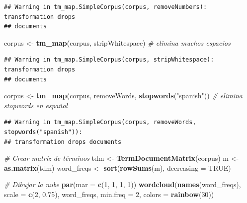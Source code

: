 \documentclass[
]{article}
\newenvironment{Shaded}{\begin{snugshade}}{\end{snugshade}}
\newcommand{\AttributeTok}[1]{\textcolor[rgb]{0.13,0.29,0.53}{#1}}
\newcommand{\CommentTok}[1]{\textcolor[rgb]{0.56,0.35,0.01}{\textit{#1}}}
\newcommand{\ConstantTok}[1]{\textcolor[rgb]{0.56,0.35,0.01}{#1}}
\newcommand{\DecValTok}[1]{\textcolor[rgb]{0.00,0.00,0.81}{#1}}
\newcommand{\FloatTok}[1]{\textcolor[rgb]{0.00,0.00,0.81}{#1}}
\newcommand{\FunctionTok}[1]{\textcolor[rgb]{0.13,0.29,0.53}{\textbf{#1}}}
\newcommand{\NormalTok}[1]{#1}
\newcommand{\OtherTok}[1]{\textcolor[rgb]{0.56,0.35,0.01}{#1}}
\newcommand{\StringTok}[1]{\textcolor[rgb]{0.31,0.60,0.02}{#1}}
\begin{document}
\begin{verbatim}
## Warning in tm_map.SimpleCorpus(corpus, removeNumbers): transformation drops
## documents
\end{verbatim}

\begin{Shaded}
\begin{Highlighting}[]
\NormalTok{corpus }\OtherTok{\textless{}{-}} \FunctionTok{tm\_map}\NormalTok{(corpus, stripWhitespace)                      }\CommentTok{\# elimina muchos espacios}
\end{Highlighting}
\end{Shaded}

\begin{verbatim}
## Warning in tm_map.SimpleCorpus(corpus, stripWhitespace): transformation drops
## documents
\end{verbatim}

\begin{Shaded}
\begin{Highlighting}[]
\NormalTok{corpus }\OtherTok{\textless{}{-}} \FunctionTok{tm\_map}\NormalTok{(corpus, removeWords, }\FunctionTok{stopwords}\NormalTok{(}\StringTok{"spanish"}\NormalTok{))    }\CommentTok{\# elimina stopwords en español}
\end{Highlighting}
\end{Shaded}

\begin{verbatim}
## Warning in tm_map.SimpleCorpus(corpus, removeWords, stopwords("spanish")):
## transformation drops documents
\end{verbatim}

\begin{Shaded}
\begin{Highlighting}[]
\CommentTok{\# Crear matriz de términos}
\NormalTok{tdm }\OtherTok{\textless{}{-}} \FunctionTok{TermDocumentMatrix}\NormalTok{(corpus)}
\NormalTok{m }\OtherTok{\textless{}{-}} \FunctionTok{as.matrix}\NormalTok{(tdm)}
\NormalTok{word\_freqs }\OtherTok{\textless{}{-}} \FunctionTok{sort}\NormalTok{(}\FunctionTok{rowSums}\NormalTok{(m), }\AttributeTok{decreasing =} \ConstantTok{TRUE}\NormalTok{)}

\CommentTok{\# Dibujar la nube}
\FunctionTok{par}\NormalTok{(}\AttributeTok{mar =} \FunctionTok{c}\NormalTok{(}\DecValTok{1}\NormalTok{, }\DecValTok{1}\NormalTok{, }\DecValTok{1}\NormalTok{, }\DecValTok{1}\NormalTok{))}
\FunctionTok{wordcloud}\NormalTok{(}\FunctionTok{names}\NormalTok{(word\_freqs), }\AttributeTok{scale =} \FunctionTok{c}\NormalTok{(}\DecValTok{2}\NormalTok{, }\FloatTok{0.75}\NormalTok{), word\_freqs, }\AttributeTok{min.freq =} \DecValTok{2}\NormalTok{, }
          \AttributeTok{colors =} \FunctionTok{rainbow}\NormalTok{(}\DecValTok{30}\NormalTok{))}
\end{Highlighting}
\end{Shaded}
\end{document}
